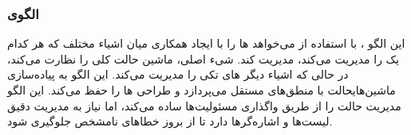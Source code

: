 \subsubsection{الگوی }
\label{smDecomAndStateSec}
\begin{RTL}
این الگو \cite{ref1}، با استفاده از
 می‌خواهد ها را
با ایجاد همکاری میان اشیاء مختلف که هر کدام یک 
را مدیریت می‌کند، مدیریت کند.
شیء اصلی، ماشین حالت کلی را نظارت می‌کند، در حالی که اشیاء دیگر
های تکی را مدیریت می‌کند. این الگو به پیاده‌سازی
ماشین‌هایحالت با منطق‌های مستقل می‌پردازد و
طراحی ها را حفظ می‌کند.
این الگو مدیریت حالت را از طریق واگذاری مسئولیت‌ها ساده می‌کند،
اما نیاز به مدیریت دقیق لیست‌ها و اشاره‌گرها دارد تا
از بروز خطاهای نامشخص جلوگیری شود.
\end{RTL}